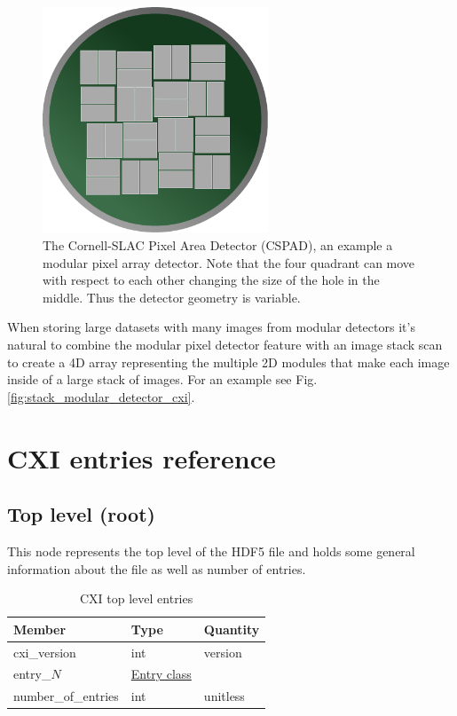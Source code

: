 \documentclass[usletter,11pt]{article}
\begin{document}
\begin{figure}[h!]
\centering
\includegraphics[width=0.6\textwidth]{cspad.pdf}
\caption{The Cornell-SLAC Pixel Area Detector (CSPAD), an example a modular
  pixel array detector. Note that the four quadrant can move with respect to
  each other changing the size of the hole in the middle. Thus the detector
  geometry is variable.}
\label{fig:cspad}
\end{figure}

When storing large datasets with many images from modular detectors it's natural
to combine the modular pixel detector feature with an image stack
scan to create a 4D array representing the multiple 2D modules that make
each image inside of a large stack of images. For an example see Fig. \ref{fig:stack_modular_detector_cxi}.
\clearpage
\appendix

 

\section{CXI entries reference}

\subsection{Top level (root)}
\label{table:top}

This node represents the top level of the HDF5 file and holds some
general information about the file as well as number of entries.

\begin{table}[h!]\sffamily
\footnotesize
\caption{CXI top level entries}

\begin{tabular}{p{4.5cm} p{4.5cm}  p{2.5cm}}
\toprule
\bfseries Member     & \bfseries Type & \bfseries Quantity \\
\midrule

cxi\_version & int & version  \\
entry\_$N$ &  \hyperref[table:entry]{Entry class} & \\
number\_of\_entries & int & unitless \\
\bottomrule
\end{tabular}
\end{table}
\end{document}
